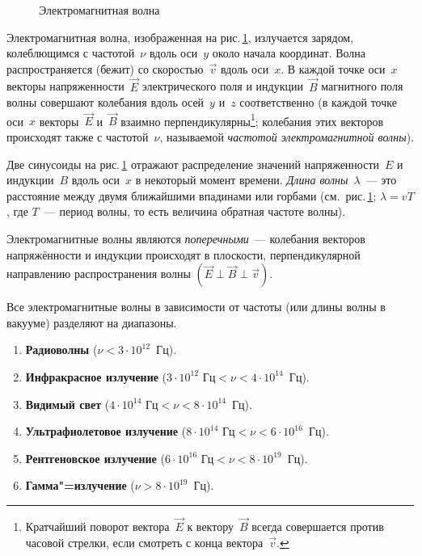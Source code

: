 \documentclass[main.tex]{subfiles}
\begin{document}
\begin{figure}[H]
\caption{Электромагнитная волна}
\label{fig:p172}
\end{figure}

Электромагнитная волна, изображенная на рис.\,\ref{fig:p172}, излучается зарядом, колеблющимся с частотой~$\nu$ вдоль оси~$y$ около начала координат. Волна распространяется (бежит) со скоростью~$\vec v$ вдоль оси~$x$. В каждой точке оси~$x$ векторы напряженности~$\vec E$ электрического поля и индукции~$\vec B$ магнитного поля волны совершают колебания вдоль осей~$y$ и~$z$ соответственно (в каждой точке оси~$x$ векторы~$\vec E$ и~$\vec B$ взаимно перпендикулярны\footnote{Кратчайший поворот вектора~$\vec E$ к вектору~$\vec B$ всегда совершается против часовой стрелки, если смотреть с конца вектора~$\vec v$.}; колебания этих векторов происходят также с частотой~$\nu$, называемой \emph{частотой электромагнитной волны}). 

Две синусоиды на рис.\,\ref{fig:p172} отражают распределение значений напряженности~$E$ и индукции~$B$ вдоль оси~$x$ в некоторый момент времени. \emph{Длина волны}~$\lambda$~--- это расстояние между двумя ближайшими впадинами или горбами (см.~рис.\,\ref{fig:p172}; $\lambda=vT$, где $T$~--- период волны, то есть величина обратная частоте волны). 

Электромагнитные волны являются \emph{поперечными}~--- колебания векторов напряжённости и индукции происходят в плоскости, перпендикулярной направлению распространения волны $(\vec E\perp\vec B\perp\vec v)$.

Все электромагнитные волны в зависимости от частоты (или длины волны в вакууме) разделяют на диапазоны.
\begin{enumerate}
    \item \textbf{Радиоволны} ($\nu<3\cdot10^{12}$~Гц).
    \item \textbf{Инфракрасное излучение} ($3\cdot10^{12}\text{~Гц}<\nu<4\cdot10^{14}$~Гц).
    \item \textbf{Видимый свет} ($4\cdot10^{14}\text{~Гц}<\nu<8\cdot10^{14}$~Гц).
    \item \textbf{Ультрафиолетовое излучение} ($8\cdot10^{14}\text{~Гц}<\nu<6\cdot10^{16}$~Гц).
    \item \textbf{Рентгеновское излучение} ($6\cdot10^{16}\text{~Гц}<\nu<8\cdot10^{19}$~Гц).
    \item \textbf{Гамма"=излучение} ($\nu>8\cdot10^{19}$~Гц).
\end{enumerate}








 
\end{document}
